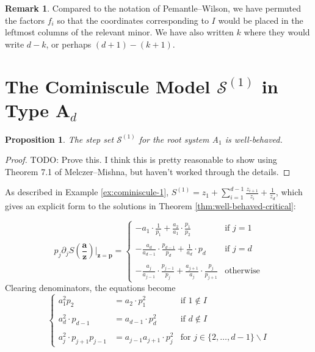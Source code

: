 \documentclass[A4,12pt]{article}
\newcommand{\<}{\left\langle}
\renewcommand{\>}{\right\rangle}
\newcommand{\steps}{\mathcal{S}}
\newcommand{\z}{\mathbf{z}}
\renewcommand{\a}{\mathbf{a}}
\newcommand{\ts}{\textstyle}
\newtheorem{proposition}[theorem]{Proposition}
\theoremstyle{definition}
\theoremstyle{example}
\newtheorem{remark}[theorem]{Remark}
\begin{document}
\begin{remark}
Compared to the notation of Pemantle--Wilson, we have permuted the factors $f_i$ so that the coordinates corresponding to $I$ would be placed in the leftmost columns of the relevant minor. We have also written $k$ where they would write $d-k$, or perhaps $(d+1)-(k+1)$.
\end{remark}

\section{The Cominiscule Model $\steps^{(1)}$ in Type A$_d$}

\begin{proposition}
The step set $\steps^{(1)}$ for the root system A$_1$ is well-behaved.
\end{proposition}

\begin{proof}
TODO: Prove this. I think this is pretty reasonable to show using Theorem 7.1 of Melczer--Mishna, but haven't worked through the details.
\end{proof}

As described in Example \ref{ex:cominiscule-1}, $S^{(1)}=z_1 + \sum_{i=1}^{d-1} \frac{z_{i+1}}{z_i} + \frac{1}{z_d}$, which gives an explicit form to the solutions in Theorem \ref{thm:well-behaved-critical}:

\[
p_j \partial_j S({\ts\frac{\a}{\z}})\Big\vert_{\z=\mathbf{p}}
= \left\{ \begin{array}{ll}
-a_1\cdot \frac{1}{p_1} + \frac{a_2}{a_1}\cdot\frac{p_1}{p_2} & \text{if } j=1 \\~\\
-\frac{a_d}{a_{d-1}}\cdot \frac{p_{d-1}}{p_d} + \frac{1}{a_d}\cdot p_d &  \text{if } j=d \\~\\
-\frac{a_j}{a_{j-1}}\cdot \frac{p_{j-1}}{p_j} + \frac{a_{j+1}}{a_j}\cdot\frac{p_{j}}{p_{j+1}} & \text{otherwise}
\end{array} \right.
\]
Clearing denominators, the equations become
\[
\left\{ \begin{array}{lll}
a_1^2p_2 &= a_2\cdot p_1^2 & \text{if } 1\notin I \\~\\
a_d^2\cdot p_{d-1} &= a_{d-1}\cdot p_d^2 & \text{if } d\notin I \\~\\
a_j^2\cdot p_{j+1}p_{j-1} &= a_{j-1}a_{j+1}\cdot p_j^2 & \text{for } j\in \{2,\dots, d-1\}\smallsetminus I
\end{array} \right.
\]
\end{document}

